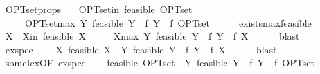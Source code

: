 \begin{isabellebody}
{\isafoldproof}%
%
\isadelimproof
\isanewline
%
\endisadelimproof
\isanewline
{}\isamarkupfalse%
\ OPT{\isacharunderscore}{\kern0pt}set{\isacharunderscore}{\kern0pt}props{\isacharcolon}{\kern0pt}\isanewline
\ \ \ OPT{\isacharunderscore}{\kern0pt}set{\isacharunderscore}{\kern0pt}in{\isacharcolon}{\kern0pt}\ {\isachardoublequoteopen}feasible\ OPT{\isacharunderscore}{\kern0pt}set{\isachardoublequoteclose}\isanewline
\ \ \ \ \ OPT{\isacharunderscore}{\kern0pt}set{\isacharunderscore}{\kern0pt}max{\isacharcolon}{\kern0pt}\ {\isachardoublequoteopen}{\isasymforall}Y{\isachardot}{\kern0pt}\ feasible\ Y\ {\isasymlongrightarrow}\ f\ Y\ {\isasymle}\ f\ OPT{\isacharunderscore}{\kern0pt}set{\isachardoublequoteclose}\isanewline
%
\isadelimproof
%
\endisadelimproof
%
\isatagproof
{}\isamarkupfalse%
\ {\isacharminus}{\kern0pt}\isanewline
\ \ \isamarkupfalse%
\ exists{\isacharunderscore}{\kern0pt}max{\isacharunderscore}{\kern0pt}feasible\isanewline
\ \ \isamarkupfalse%
\ X\ \ X{\isacharunderscore}{\kern0pt}in{\isacharcolon}{\kern0pt}\ {\isachardoublequoteopen}feasible\ X{\isachardoublequoteclose}\isanewline
\ \ \ \ \ X{\isacharunderscore}{\kern0pt}max{\isacharcolon}{\kern0pt}\ {\isachardoublequoteopen}{\isasymforall}Y{\isachardot}{\kern0pt}\ feasible\ Y\ {\isasymlongrightarrow}\ f\ Y\ {\isasymle}\ f\ X{\isachardoublequoteclose}\isanewline
\ \ \ \ \isamarkupfalse%
\ blast\isanewline
\ \ \isamarkupfalse%
\ \isamarkupfalse%
\ ex{\isacharunderscore}{\kern0pt}spec{\isacharcolon}{\kern0pt}\isanewline
\ \ \ \ {\isachardoublequoteopen}{\isasymexists}X{\isachardot}{\kern0pt}\ feasible\ X\ {\isasymand}\ {\isacharparenleft}{\kern0pt}{\isasymforall}Y{\isachardot}{\kern0pt}\ feasible\ Y\ {\isasymlongrightarrow}\ f\ Y\ {\isasymle}\ f\ X{\isacharparenright}{\kern0pt}{\isachardoublequoteclose}\isanewline
\ \ \ \ \isamarkupfalse%
\ blast\isanewline
\ \ \isamarkupfalse%
\ someI{\isacharunderscore}{\kern0pt}ex{\isacharbrackleft}{\kern0pt}OF\ ex{\isacharunderscore}{\kern0pt}spec{\isacharbrackright}{\kern0pt}\isanewline
\ \ \isamarkupfalse%
\ {\isachardoublequoteopen}feasible\ OPT{\isacharunderscore}{\kern0pt}set\ {\isasymand}\ {\isacharparenleft}{\kern0pt}{\isasymforall}Y{\isachardot}{\kern0pt}\ feasible\ Y\ {\isasymlongrightarrow}\ f\ Y\ {\isasymle}\ f\ OPT{\isacharunderscore}{\kern0pt}set{\isacharparenright}{\kern0pt}{\isachardoublequoteclose}\isanewline

\end{isabellebody}

